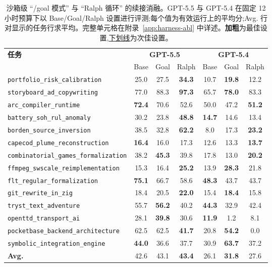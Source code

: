 \begin{table}[h]
\centering
\small
\setlength{\tabcolsep}{3pt}
\begin{tabular}{l ccc ccc}
\toprule
\multirow{2}{*}{\textbf{任务}} & \multicolumn{3}{c}{\textbf{GPT-5.5}} & \multicolumn{3}{c}{\textbf{GPT-5.4}} \\
\cmidrule(lr){2-4} \cmidrule(lr){5-7}
 & Base & Goal & Ralph & Base & Goal & Ralph \\
\midrule
\texttt{portfolio\_risk\_calibration} & 25.0 & 27.5 & \textbf{34.3} & 10.7 & \textbf{19.8} & 12.2 \\
\texttt{storyboard\_ad\_copywriting} & 77.0 & 88.3 & \textbf{97.3} & 65.7 & \textbf{78.0} & 83.3 \\
\texttt{arc\_compiler\_runtime} & \textbf{72.4} & 70.6 & 52.6 & 50.0 & 47.2 & \textbf{51.2} \\
\texttt{battery\_soh\_rul\_anomaly} & 30.2 & 23.8 & \textbf{48.8} & \textbf{14.7} & 14.6 & 13.4 \\
\texttt{borden\_source\_inversion} & 38.5 & 32.8 & \textbf{62.2} & 8.0 & 17.3 & \textbf{23.2} \\
\texttt{capecod\_plume\_reconstruction} & \textbf{16.4} & 16.0 & 17.3 & 12.6 & 13.3 & \textbf{13.7} \\
\texttt{combinatorial\_games\_formalization} & 38.2 & \textbf{45.3} & 39.8 & 17.8 & 13.0 & \textbf{20.2} \\
\texttt{ffmpeg\_swscale\_reimplementation} & 15.3 & 16.4 & \textbf{25.2} & 13.9 & \textbf{28.3} & 21.8 \\
\texttt{flt\_regular\_formalization} & \textbf{75.1} & 66.7 & 58.6 & \textbf{48.3} & 43.7 & 43.7 \\
\texttt{git\_rewrite\_in\_zig} & 18.4 & 20.5 & \textbf{22.0} & 15.4 & \textbf{18.4} & 15.8 \\
\texttt{tryst\_text\_adventure} & 55.7 & \textbf{56.2} & 40.2 & \textbf{44.3} & 32.9 & 42.4 \\
\texttt{openttd\_transport\_ai} & 28.1 & \textbf{39.8} & 30.6 & \textbf{11.9} & 1.2 & 8.1 \\
\texttt{pocketbase\_backend\_architecture} & 62.5 & 62.5 & \textbf{41.7} & 20.8 & \textbf{54.2} & 0.0 \\
\texttt{symbolic\_integration\_engine} & \textbf{44.0} & 36.6 & 37.7 & 30.9 & \textbf{63.7} & 37.2 \\
\textbf{Avg.} & 42.6 & 43.1 & \textbf{43.4} & 26.1 & \textbf{31.8} & 27.6 \\
\bottomrule
\end{tabular}
\caption{沙箱级 ``/goal 模式'' 与 ``Ralph 循环'' 的续接消融。GPT-5.5 与 GPT-5.4 在固定 12 小时预算下以 Base/Goal/Ralph 设置进行评测;每个值为有效运行上的平均分;Avg. 行对显示的任务行求平均。完整单元格在附录~\ref{app:harness-abl} 中详述。\textbf{加粗}为最佳设置,\underline{下划线}为次佳设置。}
\label{tab:harness-abl}
\end{table}

